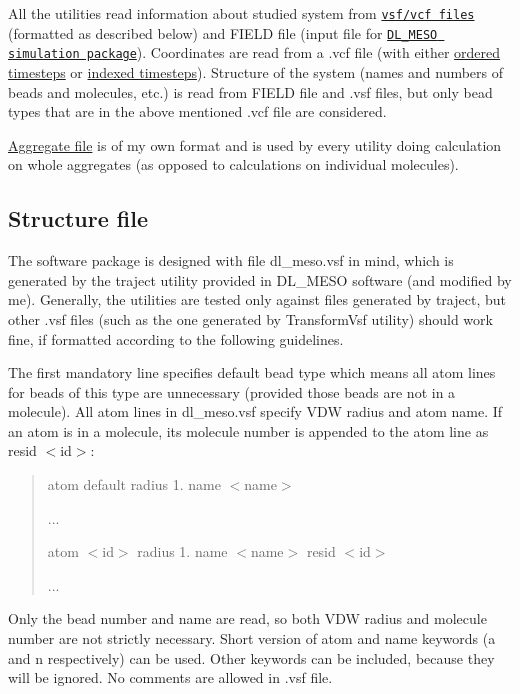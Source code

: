 All the utilities read information about studied system from \href{https://github.com/olenz/vtfplugin/wiki/VTF-format}{\tt vsf/vcf files} (formatted as described below) and {\ttfamily F\+I\+E\+LD} file (input file for \href{http://www.scd.stfc.ac.uk//research/app/ccg/software/DL_MESO/40694.aspx}{\tt D\+L\+\_\+\+M\+E\+SO simulation package}). Coordinates are read from a {\ttfamily .vcf} file (with either \hyperlink{InputFiles_OrderedCoorFile}{ordered timesteps} or \hyperlink{InputFiles_IndexedCoorFile}{indexed timesteps}). Structure of the system (names and numbers of beads and molecules, etc.) is read from {\ttfamily F\+I\+E\+LD} file and {\ttfamily .vsf} files, but only bead types that are in the above mentioned {\ttfamily .vcf} file are considered.

\hyperlink{InputFiles_AggregateFile}{Aggregate file} is of my own format and is used by every utility doing calculation on whole aggregates (as opposed to calculations on individual molecules).\hypertarget{InputFiles_StructureFile}{}\subsection{Structure file }\label{InputFiles_StructureFile}
The software package is designed with file {\ttfamily dl\+\_\+meso.\+vsf} in mind, which is generated by the {\ttfamily traject} utility provided in D\+L\+\_\+\+M\+E\+SO software (and modified by me). Generally, the utilities are tested only against files generated by {\ttfamily traject}, but other {\ttfamily .vsf} files (such as the one generated by {\ttfamily Transform\+Vsf} utility) should work fine, if formatted according to the following guidelines.

The first mandatory line specifies default bead type which means all atom lines for beads of this type are unnecessary (provided those beads are not in a molecule). All atom lines in {\ttfamily dl\+\_\+meso.\+vsf} specify V\+DW radius and atom name. If an atom is in a molecule, its molecule number is appended to the atom line as {\ttfamily resid $<$id$>$}\+: \begin{quote}
{\ttfamily atom default radius 1. name $<$name$>$}

{\ttfamily ...}

{\ttfamily atom $<$id$>$ radius 1. name $<$name$>$ resid $<$id$>$}

{\ttfamily ...} \end{quote}


Only the bead number and name are read, so both V\+DW radius and molecule number are not strictly necessary. Short version of {\ttfamily atom} and {\ttfamily name} keywords ({\ttfamily a} and {\ttfamily n} respectively) can be used. Other keywords can be included, because they will be ignored. No comments are allowed in {\ttfamily .vsf} file.

